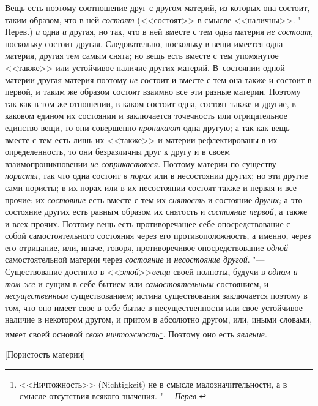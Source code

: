 Вещь есть поэтому соотношение друг с другом материй, из которых она состоит,
таким образом, что в ней {\em состоят} (<<состоят>> в
смысле <<наличны>>. "--- Перев.) {\em и} одна
{\em и} другая, но так, что в ней вместе с тем одна
материя {\em не состоит}, поскольку состоит другая.
Следовательно, поскольку в вещи имеется одна материя, другая тем самым
снята; но вещь есть вместе с тем упомянутое <<также>> или устойчивое наличие
других материй. В~состоянии одной материи другая материя поэтому
{\em не} состоит и вместе с тем она также и состоит в
первой, и таким же образом состоят взаимно все эти разные материи. Поэтому
так как в том же отношении, в каком состоит одна, состоят также и другие, в
каковом едином их состоянии и заключается точечность или отрицательное
единство вещи, то они совершенно {\em проникают} одна
другую; а так как вещь вместе с тем есть лишь их <<также>> и материи
рефлектированы в их определенность, то они безразличны друг к другу и в
своем взаимопроникновении {\em не соприкасаются}.
Поэтому материи по существу {\em пористы}, так что одна
состоит {\em в порах} или в несостоянии других; но эти
другие сами пористы; в их порах или в их несостоянии состоят также и первая
и все прочие; их {\em состояние} есть вместе с тем их
{\em снятость} и состояние {\em других;} а это состояние других есть равным
образом их снятость и {\em состояние первой}, а также и
всех прочих. Поэтому вещь есть противоречащее себе опосредствование с собой
самостоятельного состояния через его противоположность, а именно, через его
отрицание, или, иначе, говоря, противоречивое опосредствование
{\em одной} самостоятельной материи через {\em состояние} и {\em несостояние
другой}. "--- Существование достигло в <<{\em этой}>>{\em вещи} своей
полноты, будучи в {\em одном и том же} и сущим-в-себе
бытием или {\em самостоятельным} состоянием, и
{\em несущественным} существованием; истина
существования заключается поэтому в том, что оно имеет свое в-себе-бытие в
несущественности или свое устойчивое наличие в некотором другом, и притом в
абсолютно другом, или, иными словами, имеет своей основой
{\em свою ничтожность}\footnote{<<Ничтожность>> (Nichtig\-keit) не
в смысле малозначительности, а в смысле отсутствия всякого
значения. "--- {\em Перев.}}. Поэтому оно есть {\em явление}.

%
  {[Пористость материи]}

